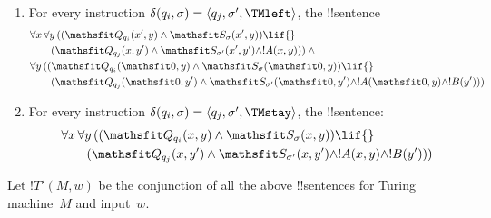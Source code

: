 \documentclass[../../../include/open-logic-section]{subfiles}
\begin{document}
\begin{enumerate}
\begin{enumerate}
\item {} For every instruction $\delta(q_i, \sigma) =
  \tuple{q_j, \sigma', \TMleft}$, the !!{sentence}
\begin{align*}
& \lforall[x][\lforall[y][
    ((\Obj Q_{q_i}(x', y) \land \Obj S_{\sigma}(x', y)) \lif {}]]\\
& \qquad   (\Obj Q_{q_j}(x, y') \land \Obj S_{\sigma'}(x', y') \land
!A(x, y))) \land {}\\
& \lforall[y][((\Obj Q_{q_i}(\Obj 0, y) \land \Obj S_{\sigma}(\Obj 0,
    y)) \lif {}]\\
& \qquad (\Obj Q_{q_j}(\Obj 0, y') \land \Obj S_{\sigma'}(\Obj 0,
  y') \land !A(\Obj 0, y) \land !B(y')))
\end{align*}
\item {} For every instruction $\delta(q_i, \sigma) =
  \tuple{q_j, \sigma', \TMstay}$, the !!{sentence}:
\begin{align*}
& \lforall[x][\lforall[y][(
   (\Obj Q_{q_i}(x, y) \land \Obj S_{\sigma}(x, y)) \lif {}]] \\
&\qquad (\Obj Q_{q_j}(x, y') \land \Obj S_{\sigma'}(x, y') \land
!A(x, y) \land !B(y')))
\end{align*}
\end{enumerate}
\end{enumerate}
Let $!T'(M, w)$ be the conjunction of all the above !!{sentence}s for Turing
machine~$M$ and input~$w$.
\end{document}
